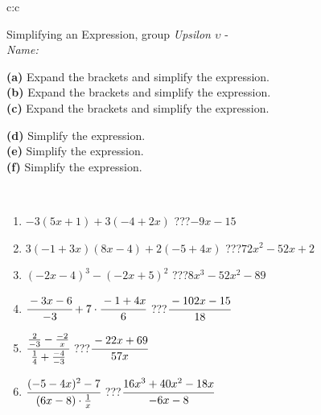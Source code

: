 \documentclass[10pt]{report}
\begin{document}
\newpage
\thispagestyle{empty}
\begin{tabular}{c:c}
\begin{minipage}[c][104.5mm][t]{0.5\linewidth}
\begin{center}
\vspace{7mm}
{\huge Simplifying an Expression, group \textit{Upsilon $\upsilon$} -}\\[5mm]
\textit{Name:}\phantom{xxxxxxxxxxxxxxxxxxxxxxxxxxxxxxxxxxxxxxxxxxxxxxxxxxxxxxxxxxxxxxxxx}\\[5mm]
\begin{minipage}{0.95\linewidth}
\begin{center}
{\small \begin{minipage}{0.6\textwidth}
\textbf{(a)} Expand the brackets and simplify the expression. \\[1mm]
\textbf{(b)} Expand the brackets and simplify the expression. \\[1mm]
\textbf{(c)} Expand the brackets and simplify the expression.
\end{minipage} \begin{minipage}{0.39\textwidth}
\textbf{(d)} Simplify the expression. \\[1mm]
\textbf{(e)} Simplify the expression. \\[1mm]
\textbf{(f)} Simplify the expression.
\end{minipage}
}
\end{center}
\end{minipage}
\\[4mm]
\begin{minipage}{0.79\linewidth}
\begin{center}
\begin{varwidth}{\linewidth}
\begin{enumerate}
\normalsize
\item $-3(5x+1)+3(-4+2x)$\quad \dotfill\; ???\;\dotfill \quad $-9x-15$
\item $3(-1+3x)(8x-4)+2(-5+4x)$\quad \dotfill\; ???\;\dotfill \quad $72x^2-52x+2$
\item $(-2x-4)^3-(-2x+5)^2$\quad \dotfill\; ???\;\dotfill \quad $8x^3-52x^2-89$
\item $\cfrac{-3x-6}{-3}+7\cdot\cfrac{-1+4x}{6}$\quad \dotfill\; ???\;\dotfill \quad $\cfrac{-102x-15}{18}$
\item $\cfrac{\frac{2}{-3}-\frac{-2}{x}}{\frac{1}{4}+\frac{-4}{-3}}$\quad \dotfill\; ???\;\dotfill \quad $\cfrac{-22x+69}{57x}$
\item $\cfrac{(-5-4x)^2-7}{(6x-8)\cdot\frac{1}{x}}$\quad \dotfill\; ???\;\dotfill \quad $\cfrac{16x^3+40x^2-18x}{-6x-8}$

\end{enumerate}
\end{varwidth}
\end{center}
\end{minipage}
\end{center}
\end{minipage}
\end{tabular}
\end{document}
